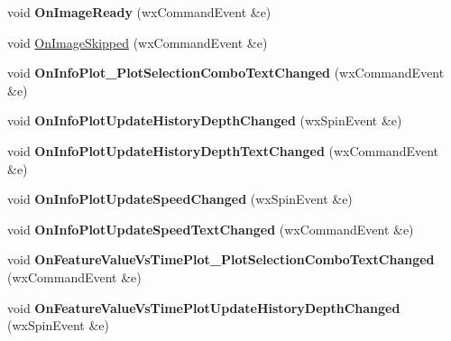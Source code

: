 \begin{DoxyCompactItemize}
\item 
\hypertarget{class_prop_view_frame_adf55f8147ea5e8018c6f5eec475b4241}{void {\bfseries On\+Image\+Ready} (wx\+Command\+Event \&e)}\label{class_prop_view_frame_adf55f8147ea5e8018c6f5eec475b4241}

\item 
void \hyperlink{class_prop_view_frame_ad015438bd5479213972cccde44c3e727}{On\+Image\+Skipped} (wx\+Command\+Event \&e)
\item 
\hypertarget{class_prop_view_frame_a6a748decc0fa8a7749879ce4b76076c6}{void {\bfseries On\+Info\+Plot\+\_\+\+Plot\+Selection\+Combo\+Text\+Changed} (wx\+Command\+Event \&e)}\label{class_prop_view_frame_a6a748decc0fa8a7749879ce4b76076c6}

\item 
\hypertarget{class_prop_view_frame_a28154531a83e5270c05214d2dae092d7}{void {\bfseries On\+Info\+Plot\+Update\+History\+Depth\+Changed} (wx\+Spin\+Event \&e)}\label{class_prop_view_frame_a28154531a83e5270c05214d2dae092d7}

\item 
\hypertarget{class_prop_view_frame_aa69ec8f23c7a88f6f2d1accc8f5b48d4}{void {\bfseries On\+Info\+Plot\+Update\+History\+Depth\+Text\+Changed} (wx\+Command\+Event \&e)}\label{class_prop_view_frame_aa69ec8f23c7a88f6f2d1accc8f5b48d4}

\item 
\hypertarget{class_prop_view_frame_af2fb8ec3307cbc85ff1b33d70a1adc35}{void {\bfseries On\+Info\+Plot\+Update\+Speed\+Changed} (wx\+Spin\+Event \&e)}\label{class_prop_view_frame_af2fb8ec3307cbc85ff1b33d70a1adc35}

\item 
\hypertarget{class_prop_view_frame_afa1938f723553edfeef2966ddf4cc224}{void {\bfseries On\+Info\+Plot\+Update\+Speed\+Text\+Changed} (wx\+Command\+Event \&e)}\label{class_prop_view_frame_afa1938f723553edfeef2966ddf4cc224}

\item 
\hypertarget{class_prop_view_frame_a9d3e30be4a88a453d86108ff6f454ff6}{void {\bfseries On\+Feature\+Value\+Vs\+Time\+Plot\+\_\+\+Plot\+Selection\+Combo\+Text\+Changed} (wx\+Command\+Event \&e)}\label{class_prop_view_frame_a9d3e30be4a88a453d86108ff6f454ff6}

\item 
\hypertarget{class_prop_view_frame_a911fb66f3582d08d7ceb53233767bd0c}{void {\bfseries On\+Feature\+Value\+Vs\+Time\+Plot\+Update\+History\+Depth\+Changed} (wx\+Spin\+Event \&e)}\label{class_prop_view_frame_a911fb66f3582d08d7ceb53233767bd0c}


\end{DoxyCompactItemize}
